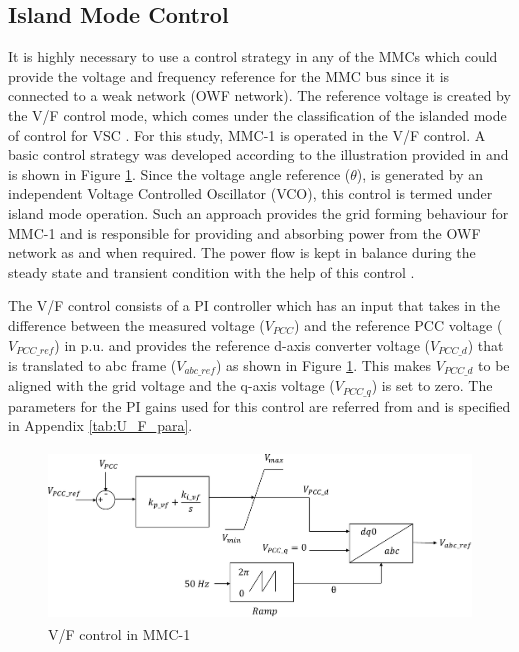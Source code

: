\subsection{Island Mode Control}
It is highly necessary to use a control strategy in any of the \gls{MMC}s which could provide the voltage and frequency reference for the \gls{MMC} bus since it is connected to a weak network (\gls{OWF} network). The reference voltage is created by the V/F control mode, which comes under the classification of the islanded mode of control for \gls{VSC} \cite{vrana2013cigre}. For this study, \gls{MMC}-1 is operated in the V/F control. A basic control strategy was developed according to the illustration provided in \cite{wachal2014guide} and is shown in Figure \ref{fig:U_F_control}. Since the voltage angle reference ($\theta$), is generated by an independent Voltage Controlled Oscillator (VCO), this control is termed under island mode operation. Such an approach provides the grid forming behaviour for \gls{MMC}-1 and is responsible for providing and absorbing power from the \gls{OWF} network as and when required. The power flow is kept in balance during the steady state and transient condition with the help of this control \cite{cigre_B455}.  

The V/F control consists of a \gls{PI} controller which has an input that takes in the difference between the measured voltage ($V_{PCC}$) and the reference \gls{PCC} voltage ($V_{PCC\_ref}$) in p.u. and provides the reference d-axis converter voltage ($V_{PCC\_d}$) that is translated to abc frame ($V_{abc\_ref}$) as shown in Figure \ref{fig:U_F_control}. This makes $V_{PCC\_d}$ to be aligned with the grid voltage and the q-axis voltage ($V_{PCC\_q}$) is set to zero. The parameters for the \gls{PI} gains used for this control are referred from \cite{vrana2013cigre} and is specified in Appendix \ref{tab:U_F_para}. 

\begin{figure}[H]
\centering
    \includegraphics[height = 4.5cm,width = 12.5cm]{Diagrams/Chapter_4/U_F_control.pdf}
    \caption{V/F control in MMC-1 \cite{vrana2013cigre}}
    \label{fig:U_F_control}
\end{figure}


